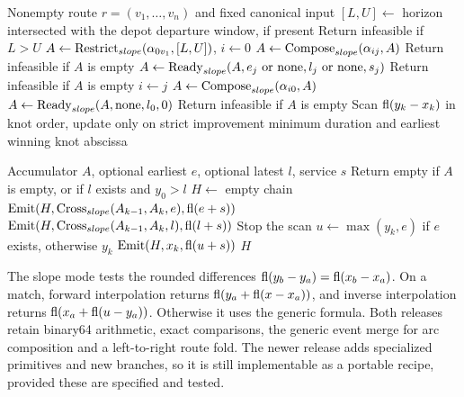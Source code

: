 \begin{algorithm}[htbp]
\caption{Route evaluation in 0.12.0 (\contracttwo)}\label{alg:new}
\begin{algorithmic}[1]
\Require Nonempty route $r=(v_1,\dots,v_n)$ and fixed canonical input
\State $[L,U]\gets$ horizon intersected with the depot departure window, if present
\State Return infeasible if $L>U$
\State $A\gets\operatorname{Restrict}_{slope}(\alpha_{0v_1},[L,U])$, $i\gets0$
    \State $A\gets\operatorname{Compose}_{slope}(\alpha_{ij},A)$
  \EndIf
  \State Return infeasible if $A$ is empty
  \State $A\gets\operatorname{Ready}_{slope}(A,e_j\text{ or none},l_j\text{ or none},s_j)$
  \State Return infeasible if $A$ is empty
  \State $i\gets j$
\EndFor
\State $A\gets\operatorname{Compose}_{slope}(\alpha_{i0},A)$
  \State $A\gets\operatorname{Ready}_{slope}(A,\text{none},l_0,0)$
\EndIf
\State Return infeasible if $A$ is empty
\State Scan $\operatorname{fl}(y_k-x_k)$ in knot order, update only on strict improvement
\State \Return minimum duration and earliest winning knot abscissa
\end{algorithmic}
\end{algorithm}

\begin{algorithm}[htbp]
\caption{Specialized ready-time scan used by 0.12.0}\label{alg:ready}
\begin{algorithmic}[1]
\Require Accumulator $A$, optional earliest $e$, optional latest $l$, service $s$
\State Return empty if $A$ is empty, or if $l$ exists and $y_0>l$
\State $H\gets$ empty chain
    \State $\operatorname{Emit}(H,\operatorname{Cross}_{slope}(A_{k-1},A_k,e),\operatorname{fl}(e+s))$
  \EndIf
      \State $\operatorname{Emit}(H,\operatorname{Cross}_{slope}(A_{k-1},A_k,l),\operatorname{fl}(l+s))$
    \EndIf
    \State Stop the scan
  \EndIf
  \State $u\gets\max(y_k,e)$ if $e$ exists, otherwise $y_k$
  \State $\operatorname{Emit}(H,x_k,\operatorname{fl}(u+s))$
\EndFor
\State \Return $H$
\end{algorithmic}
\end{algorithm}

The slope mode tests the rounded differences $\operatorname{fl}(y_b-y_a)=\operatorname{fl}(x_b-x_a)$. On a match, forward interpolation returns $\operatorname{fl}(y_a+\operatorname{fl}(x-x_a))$, and inverse interpolation returns $\operatorname{fl}(x_a+\operatorname{fl}(u-y_a))$. Otherwise it uses the generic formula. Both releases retain binary64 arithmetic, exact comparisons, the generic event merge for arc composition and a left-to-right route fold. The newer release adds specialized primitives and new branches, so it is still implementable as a portable recipe, provided these are specified and tested.


